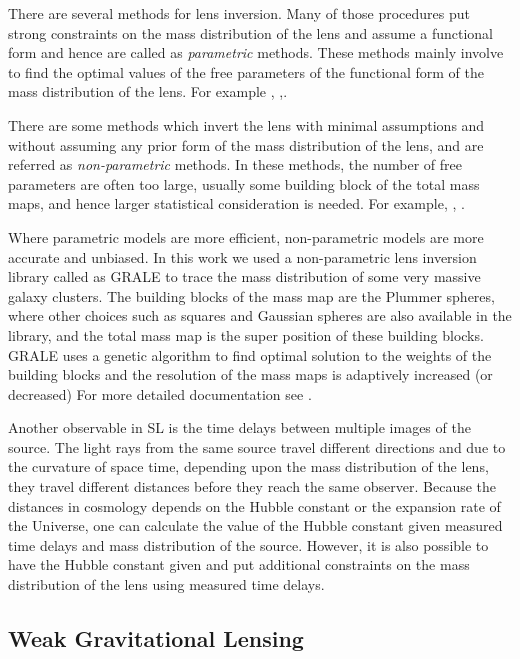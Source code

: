 There are 
several methods for lens inversion. Many of those procedures put strong constraints
on the mass distribution of the lens and assume a functional form and hence are called
as {\it parametric} methods. These methods mainly involve to find the optimal values 
of the free parameters of the functional form of the mass distribution of the lens. 
For example \cite{}, \cite{},\cite{}.

There are some methods which invert the lens with minimal assumptions and without
assuming any prior form of the mass distribution of the lens, and are referred as
{\it non-parametric} methods. In these methods, the number of free parameters are often
too large, usually some building block of the total mass maps, and hence larger
statistical consideration is needed. For example, \cite{}, \cite{}.

Where parametric models are more efficient, non-parametric models are more
accurate and unbiased. In this work we used a non-parametric lens inversion
library called as GRALE \cite{} to trace the mass distribution of some very massive
galaxy clusters. The building blocks of the mass map are the Plummer spheres, where
other choices such as squares and Gaussian spheres are also available in the library, 
and the total mass map is the super position of these building blocks. GRALE uses
a genetic algorithm \citep{} to find optimal solution to the weights of the building 
blocks and the resolution of the mass maps is adaptively increased (or decreased)
For more detailed documentation see \cite{}.

Another observable in SL is the time delays between multiple images
of the source. The light rays from the same source travel different directions
and due to the curvature of space time, depending upon the mass distribution 
of the lens, they travel different distances before they reach the same 
observer. Because the distances in cosmology depends on the Hubble constant
or the expansion rate of the Universe, one can calculate the value of the
Hubble constant given measured time delays and mass distribution of the source. 
However, it is also possible to have the Hubble constant given and put
additional constraints on the mass distribution of the lens using measured
time delays. 


\subsection{Weak Gravitational Lensing}\label{sec:wl}

